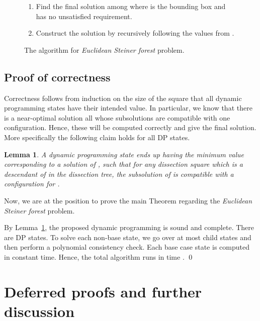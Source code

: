 \documentclass[extras,11pt]{article} \usepackage{fullpage}
\theoremstyle{mytheorem}
\newtheorem{lemma}[theorem]{Lemma}
\newenvironment{proofof}[1]{\par\noindent{\bf #1.}\hspace{0.5em}}
    {\hfill\qed\vspace{1ex}}
\newcommand{\prob}[1]{\textit{#1}}
\begin{document}
\begin{figure}
\begin{algorithm}
\begin{enumerate}
\begin{enumerate}
\end{enumerate}
\item Find the final solution among  where  is the bounding box and  has no unsatisfied requirement.
\item Construct the solution  by recursively following the values from .
\end{enumerate}
\end{algorithm}
\caption{The algorithm for \prob{Euclidean Steiner forest} problem.\label{fig:for-alg}}
\end{figure}



\subsection{Proof of correctness}
Correctness follows from induction on the size of the square  that all dynamic programming states have their intended value.
In particular, we know that there is a near-optimal solution all whose subsolutions are compatible with one configuration.
Hence, these will be computed correctly and give the final solution.
More specifically the following claim holds for all DP states.
\begin{lemma}\label{lem:dp-sf}
A dynamic programming state  ends up having the minimum value corresponding to a solution  of , such that for any dissection square  which is a descendant of  in the dissection tree, the subsolution  of  is compatible with a configuration  for .
\end{lemma}



Now, we are at the position to prove the main Theorem regarding the \prob{Euclidean Steiner forest} problem.
\begin{proofof}{\proofname\ of Theorem~\ref{thm:sf}}
By Lemma~\ref{lem:dp-sf}, the proposed dynamic programming is sound and complete.
There are  DP states.
To solve each non-base state, we go over at most  child states and then perform a polynomial consistency check.
Each base case state is computed in constant time.
Hence, the total algorithm runs in time .
\end{proofof}

\fi





\section{Deferred proofs and further discussion}
\end{document}
